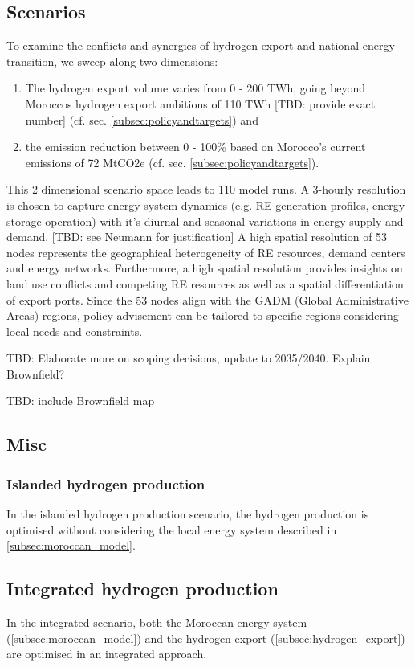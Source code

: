 \subsection{Scenarios}
\label{sec:scenarios}
To examine the conflicts and synergies of hydrogen export and national energy transition, we sweep along two dimensions:
\begin{enumerate}
    \item The hydrogen export volume varies from 0 - 200 TWh, going beyond Moroccos hydrogen export ambitions of 110 TWh [TBD: provide exact number] (cf. sec. \ref{subsec:policyandtargets}) and
    \item the emission reduction between 0 - 100\% based on Morocco's current emissions of 72 MtCO2e (cf. sec. \ref{subsec:policyandtargets}).
\end{enumerate}
This 2 dimensional scenario space leads to 110 model runs. 
A 3-hourly resolution is chosen to capture energy system dynamics (e.g. RE generation profiles, energy storage operation) with it's diurnal and seasonal variations in energy supply and demand. [TBD: see Neumann for justification]
A high spatial resolution of 53 nodes represents the geographical heterogeneity of RE resources, demand centers and energy networks. Furthermore, a high spatial resolution provides insights on land use conflicts and competing RE resources as well as a spatial differentiation of export ports. Since the 53 nodes align with the GADM (Global Administrative Areas) regions, policy advisement can be tailored to specific regions considering local needs and constraints.

TBD: Elaborate more on scoping decisions, update to 2035/2040. Explain Brownfield?


TBD: include Brownfield map


\subsection{Misc}

\subsubsection{Islanded hydrogen production}
In the islanded hydrogen production scenario, the hydrogen production is optimised without considering the local energy system described in \ref{subsec:moroccan_model}.
\subsection{Integrated hydrogen production}
In the integrated scenario, both the Moroccan energy system (\ref{subsec:moroccan_model}) and the hydrogen export (\ref{subsec:hydrogen_export})
are optimised in an integrated approach.